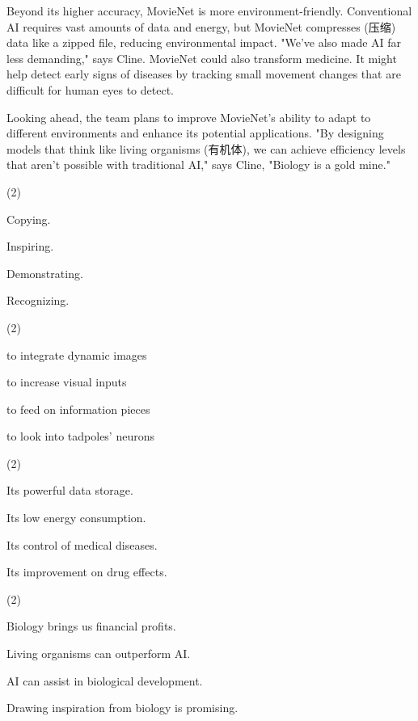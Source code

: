 \documentclass{英语试卷}
\begin{document}
\par Beyond its higher accuracy, MovieNet is more environment-friendly. Conventional AI requires vast amounts of data and energy, but MovieNet compresses (压缩) data like a zipped file, reducing environmental impact. "We’ve also made AI far less demanding," says Cline. MovieNet could also transform medicine. It might help detect early signs of diseases by tracking small movement changes that are difficult for human eyes to detect.\par
\par Looking ahead, the team plans to improve MovieNet's ability to adapt to different environments and enhance its potential applications. "By designing models that think like living organisms (有机体), we can achieve efficiency levels that aren’t possible with traditional AI," says Cline, "Biology is a gold mine."\par
{}
\begin{choices}(2)
  \item Copying.
  \item Inspiring.
  \item Demonstrating.
  \item Recognizing.
\end{choices}
\begin{choices}(2)
  \item to integrate dynamic images
  \item to increase visual inputs
  \item to feed on information pieces
  \item to look into tadpoles' neurons
\end{choices}
\begin{choices}(2)
  \item Its powerful data storage.
  \item Its low energy consumption.
  \item Its control of medical diseases.
  \item Its improvement on drug effects.
\end{choices}
\begin{choices}(2)
  \item Biology brings us financial profits.
  \item Living organisms can outperform AI.
  \item AI can assist in biological development.
  \item Drawing inspiration from biology is promising.
\end{choices}
\end{document}
